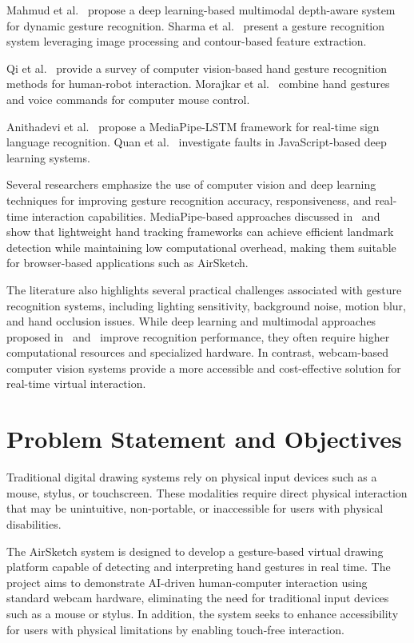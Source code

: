 \documentclass[conference]{IEEEtran}
\begin{document}
Mahmud et al.~\cite{ref5} propose a deep learning-based multimodal depth-aware system for dynamic gesture recognition. Sharma et al.~\cite{ref6} present a gesture recognition system leveraging image processing and contour-based feature extraction.

Qi et al.~\cite{ref7} provide a survey of computer vision-based hand gesture recognition methods for human-robot interaction. Morajkar et al.~\cite{ref8} combine hand gestures and voice commands for computer mouse control.

Anithadevi et al.~\cite{ref9} propose a MediaPipe-LSTM framework for real-time sign language recognition. Quan et al.~\cite{ref10} investigate faults in JavaScript-based deep learning systems.

Several researchers emphasize the use of computer vision and deep learning techniques for improving gesture recognition accuracy, responsiveness, and real-time interaction capabilities. MediaPipe-based approaches discussed in~\cite{ref3} and~\cite{ref9} show that lightweight hand tracking frameworks can achieve efficient landmark detection while maintaining low computational overhead, making them suitable for browser-based applications such as AirSketch.

The literature also highlights several practical challenges associated with gesture recognition systems, including lighting sensitivity, background noise, motion blur, and hand occlusion issues. While deep learning and multimodal approaches proposed in~\cite{ref2} and~\cite{ref5} improve recognition performance, they often require higher computational resources and specialized hardware. In contrast, webcam-based computer vision systems provide a more accessible and cost-effective solution for real-time virtual interaction. 

\section{Problem Statement and Objectives}

Traditional digital drawing systems rely on physical input devices such as a mouse, stylus, or touchscreen. These modalities require direct physical interaction that may be unintuitive, non-portable, or inaccessible for users with physical disabilities.

The AirSketch system is designed to develop a gesture-based virtual drawing platform capable of detecting and interpreting hand gestures in real time. The project aims to demonstrate AI-driven human-computer interaction using standard webcam hardware, eliminating the need for traditional input devices such as a mouse or stylus. In addition, the system seeks to enhance accessibility for users with physical limitations by enabling touch-free interaction.
\end{document}
